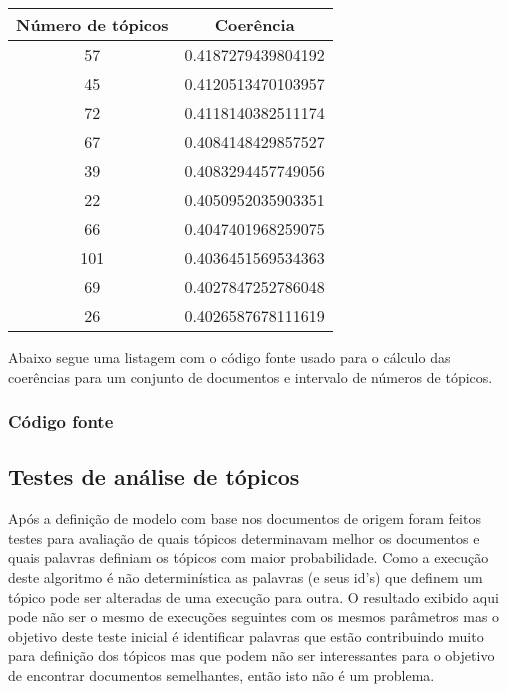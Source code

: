 \begin{center}
\begin{tabular}{ |c|c| }
 \hline
 Número de tópicos & Coerência \\ [0.5ex]
 \hline\hline
 57 & 0.4187279439804192 \\
 45 & 0.4120513470103957 \\
 72 & 0.4118140382511174 \\
 67 & 0.4084148429857527 \\
 39 & 0.4083294457749056 \\
 22 & 0.4050952035903351 \\
 66 & 0.4047401968259075 \\
 101 & 0.4036451569534363 \\
 69 & 0.4027847252786048 \\
 26 & 0.4026587678111619 \\
 \hline
\end{tabular}
\end{center}

Abaixo segue uma listagem com o código fonte usado para o cálculo das coerências para um conjunto de documentos e intervalo de números de tópicos.

\subsubsection{Código fonte}



\subsection{Testes de análise de tópicos}

Após a definição de modelo com base nos documentos de origem foram feitos testes para avaliação de quais tópicos determinavam melhor os documentos e quais 
palavras definiam os tópicos com maior probabilidade. Como a execução deste algoritmo é não determinística as palavras (e seus id's) que definem 
um tópico pode ser alteradas de uma execução para outra. O resultado exibido aqui pode não ser o mesmo de execuções seguintes com os mesmos parâmetros mas 
o objetivo deste teste inicial é identificar palavras que estão contribuindo muito para definição dos tópicos mas que podem não ser interessantes 
para o objetivo de encontrar documentos semelhantes, então isto não é um problema.

